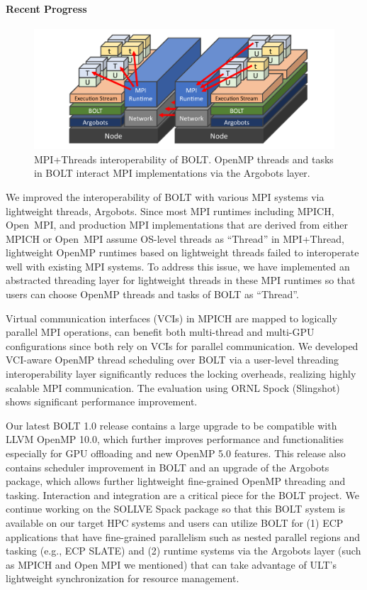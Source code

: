\paragraph{Recent Progress}

\begin{figure}[t]
  \centering
  \includegraphics[width=0.9\columnwidth]{projects/2.3.2-Tools/2.3.2.11-SOLLVE/SOLLVE-BOLT.pdf}

  \caption{\label{fig:sollve-bolt} MPI+Threads interoperability of
  BOLT.  OpenMP threads and tasks in BOLT interact MPI implementations
  via the Argobots layer.}
\end{figure}

We improved the interoperability of BOLT with various MPI systems via
lightweight threads, Argobots.  Since most MPI runtimes including
MPICH, Open~MPI, and production MPI implementations that are derived
from either MPICH or Open~MPI assume OS-level threads as ``Thread'' in
MPI+Thread, lightweight OpenMP runtimes based on lightweight threads
failed to interoperate well with existing MPI systems.  To address
this issue, we have implemented an abstracted threading layer for
lightweight threads in these MPI runtimes so that users can choose
OpenMP threads and tasks of BOLT as ``Thread''.

Virtual communication interfaces (VCIs) in MPICH are mapped to logically parallel MPI operations, can benefit both multi-thread and multi-GPU configurations since both rely on VCIs for parallel communication. We developed VCI-aware OpenMP thread scheduling over BOLT via a user-level threading interoperability layer significantly reduces the locking overheads, realizing highly scalable MPI communication. The evaluation using ORNL Spock (Slingshot) shows significant performance improvement.

Our latest BOLT 1.0 release contains a large upgrade to be compatible
with LLVM OpenMP 10.0, which further improves performance and
functionalities especially for GPU offloading and new OpenMP 5.0
features.  This release also contains scheduler improvement in BOLT
and an upgrade of the Argobots package, which allows further
lightweight fine-grained OpenMP threading and tasking.  Interaction
and integration are a critical piece for the BOLT project.  We
continue working on the SOLLVE Spack package so that this BOLT system
is available on our target HPC systems and users can utilize BOLT for
(1) ECP applications that have fine-grained parallelism such as nested
parallel regions and tasking (e.g., ECP SLATE) and (2) runtime systems
via the Argobots layer (such as MPICH and Open MPI we mentioned) that
can take advantage of ULT's lightweight synchronization for resource
management.

